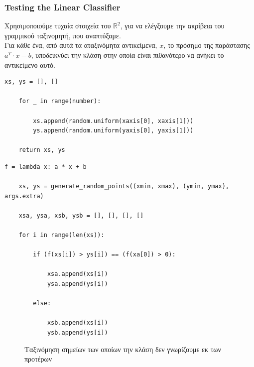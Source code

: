 \documentclass[12pt]{article}
\newcommand{\R}{\mathbb{R}}
\begin{document}
\subsubsection{Testing the Linear Classifier}

Χρησιμοποιούμε τυχαία στοιχεία του \( \R^2 \),
για να ελέγξουμε την ακρίβεια του γραμμικού ταξινομητή, που αναπτύξαμε. \\

Για κάθε ένα, από αυτά τα αταξινόμητα αντικείμενα, \( x \),
το πρόσημο της παράστασης \( a^{T} \cdot x - b \),
υποδεικνύει την κλάση στην οποία είναι πιθανότερο να ανήκει το αντικείμενο αυτό. \\

\begin{lstlisting}[caption={Η μέθοδος \textit{generate\_random\_points}}]
    xs, ys = [], []

    for _ in range(number):

        xs.append(random.uniform(xaxis[0], xaxis[1]))
        ys.append(random.uniform(yaxis[0], yaxis[1]))

    return xs, ys
\end{lstlisting}

\pagebreak

\begin{lstlisting}[caption={Η υλοποίηση της ταξινόμησης βάσει του προσήμου της παράστασης \( a^{T} \cdot x - b \)}]
    f = lambda x: a * x + b

    xs, ys = generate_random_points((xmin, xmax), (ymin, ymax), args.extra)

    xsa, ysa, xsb, ysb = [], [], [], []

    for i in range(len(xs)):

        if (f(xs[i]) > ys[i]) == (f(xa[0]) > 0):

            xsa.append(xs[i])
            ysa.append(ys[i])

        else:

            xsb.append(xs[i])
            ysb.append(ys[i])
\end{lstlisting}

\begin{figure}[hp]
    \centering
    \qquad
    \caption{Ταξινόμηση σημείων των οποίων την κλάση δεν γνωρίζουμε εκ των προτέρων}
\end{figure}
\end{document}
